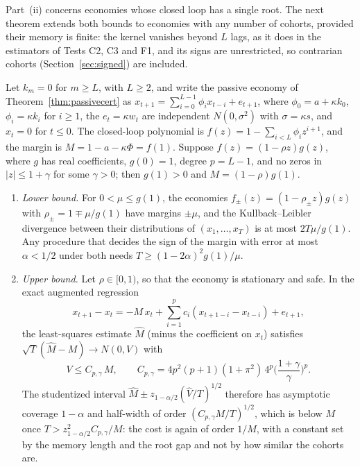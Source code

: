Part~(ii) concerns economies whose closed loop has a single root. The next theorem extends both bounds to economies with any number of cohorts, provided their memory is finite: the kernel vanishes beyond $L$ lags, as it does in the estimators of Tests C2, C3 and F1, and its signs are unrestricted, so contrarian cohorts (Section~\ref{sec:signed}) are included.

\begin{theorem}\label{thm:passivemulti}
Let $k_m=0$ for $m\ge L$, with $L\ge2$, and write the passive economy of Theorem~\ref{thm:passivecert} as $x_{t+1}=\sum_{i=0}^{L-1}\phi_ix_{t-i}+e_{t+1}$, where $\phi_0=a+\kappa k_0$, $\phi_i=\kappa k_i$ for $i\ge1$, the $e_t=\kappa w_t$ are independent $N(0,\sigma^2)$ with $\sigma=\kappa s$, and $x_t=0$ for $t\le0$. The closed-loop polynomial is $f(z)=1-\sum_{i<L}\phi_iz^{i+1}$, and the margin is $M=1-a-\kappa\Phi=f(1)$. Suppose $f(z)=(1-\rho z)g(z)$, where $g$ has real coefficients, $g(0)=1$, degree $p=L-1$, and no zeros in $|z|\le1+\gamma$ for some $\gamma>0$; then $g(1)>0$ and $M=(1-\rho)g(1)$.
\begin{enumerate}[label=(\roman*)]
\item \emph{Lower bound.} For $0<\mu\le g(1)$, the economies $f_\pm(z)=(1-\rho_\pm z)g(z)$ with $\rho_\pm=1\mp\mu/g(1)$ have margins $\pm\mu$, and the Kullback--Leibler divergence between their distributions of $(x_1,\dots,x_T)$ is at most $2T\mu/g(1)$. Any procedure that decides the sign of the margin with error at most $\alpha<1/2$ under both needs $T\ge(1-2\alpha)^2g(1)/\mu$.
\item \emph{Upper bound.} Let $\rho\in[0,1)$, so that the economy is stationary and safe. In the exact augmented regression
\[
x_{t+1}-x_t=-M\,x_t+\textstyle\sum_{i=1}^{p}c_i(x_{t+1-i}-x_{t-i})+e_{t+1},
\]
the least-squares estimate $\hat M$ (minus the coefficient on $x_t$) satisfies $\sqrt T(\hat M-M)\to N(0,V)$ with
\[
V\le C_{p,\gamma}\,M,\qquad C_{p,\gamma}=4p^2(p+1)(1+\pi^2)\,4^p\Big(\frac{1+\gamma}{\gamma}\Big)^{p}.
\]
The studentized interval $\hat M\pm z_{1-\alpha/2}(\hat V/T)^{1/2}$ therefore has asymptotic coverage $1-\alpha$ and half-width of order $(C_{p,\gamma}M/T)^{1/2}$, which is below $M$ once $T>z_{1-\alpha/2}^2C_{p,\gamma}/M$: the cost is again of order $1/M$, with a constant set by the memory length and the root gap and not by how similar the cohorts are.
\end{enumerate}
\hfill\Proved
\end{theorem}


